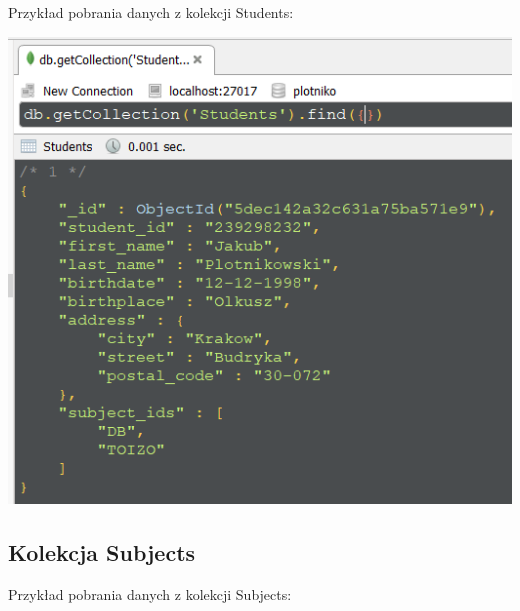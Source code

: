 \documentclass[a4paper, 11pt]{article}
\begin{document}
    

    

    Przykład pobrania danych z kolekcji Students:

    \begin{center}
        \includegraphics[scale=0.8]{images/task7/Students.png}
    \end{center}

    \newpage

    \subsection{Kolekcja Subjects}

    

    

    Przykład pobrania danych z kolekcji Subjects:
\end{document}

